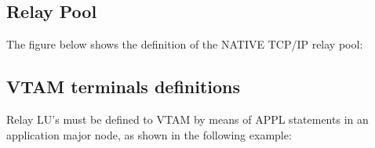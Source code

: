 \documentclass[letterpaper,10pt,english]{sphinxmanual}
\begin{document}

\subsection{Relay Pool}
\label{\detokenize{connectivity_guide:index-38}}\label{\detokenize{connectivity_guide:relay-pool}}
The figure below shows the definition of the NATIVE TCP/IP relay pool:



\subsection{VTAM terminals definitions}
\label{\detokenize{connectivity_guide:index-39}}\label{\detokenize{connectivity_guide:vtam-terminals-definitions}}
Relay LU’s must be defined to VTAM by means of APPL statements in an application major node, as shown in the following example:
\end{document}
